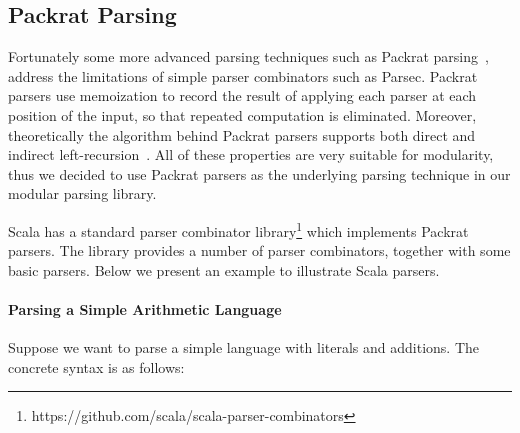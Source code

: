 \subsection{Packrat Parsing}\label{subsec:packratparsing}
Fortunately some more advanced parsing techniques such as Packrat parsing~\cite{Ford2002}, address the limitations of simple parser combinators such as Parsec. Packrat parsers use memoization to record the result of applying each parser at each position of the input, so that repeated computation is eliminated.  Moreover, theoretically the algorithm behind Packrat parsers supports both direct and indirect left-recursion~\cite{warth2008}. All of these properties are very suitable for modularity, thus we decided to use Packrat parsers as the underlying parsing technique in our modular parsing library.
\begin{comment}
It is worth mentioning that the choice of parser combinators will not
affect the other parts of our library. One can choose other parser
combinators like Parsec, in cases that the performance and supporting
of left-recursion are not major concerns. A different library can even build a new
\name with fancy features or higher efficiency.
\end{comment}
Scala has a standard parser combinator library\footnote{https://github.com/scala/scala-parser-combinators}
\cite{moors2008parser} which implements Packrat parsers.
The library provides a number of parser combinators, together with some basic parsers.
Below we present an example to illustrate Scala parsers.
%

\paragraph{Parsing a Simple Arithmetic Language}
Suppose we want to parse a simple language with literals and
additions. The concrete syntax is as follows:

